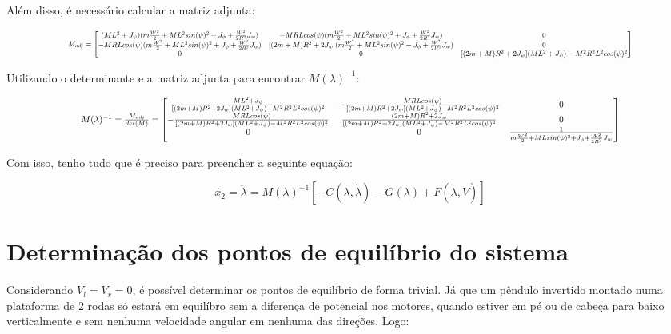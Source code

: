 \documentclass[10pt]{article}
\begin{document}
\quad Além disso, é necessário calcular a matriz adjunta:

\begin{equation}
    \scalebox{0.65}{$
    M_{adj} =
    \begin{bmatrix}
        (ML^2 + J_\psi)(m\frac{W^2}{2}+ML^2sin(\psi)^2+J_{\phi}+\frac{W^2}{2R^2}J_w) & -MRLcos(\psi)(m\frac{W^2}{2}+ML^2sin(\psi)^2+J_{\phi}+\frac{W^2}{2R^2}J_w) & 0 \\
        -MRLcos(\psi)(m\frac{W^2}{2}+ML^2sin(\psi)^2+J_{\phi}+\frac{W^2}{2R^2}J_w) & [(2m + M)R^2 + 2J_w](m\frac{W^2}{2}+ML^2sin(\psi)^2+J_{\phi}+\frac{W^2}{2R^2}J_w) & 0 \\
        0 & 0 & [(2m + M)R^2 + 2J_w](ML^2 + J_\psi) - M^2R^2L^2cos(\psi)^2
    \end{bmatrix}
    $}
\end{equation}

\quad Utilizando o determinante e a matriz adjunta para encontrar $M(\lambda)^{-1}$:

\begin{equation}
    \scalebox{0.8}{$
    M(\lambda)^{-1} = \frac{M_{adj}}{det(M)} =
    \begin{bmatrix}
        \frac{ML^2 + J_\psi}{[(2m + M)R^2 + 2J_w](ML^2 + J_\psi) - M^2R^2L^2cos(\psi)^2} & -\frac{MRLcos(\psi)}{[(2m + M)R^2 + 2J_w](ML^2 + J_\psi) - M^2R^2L^2cos(\psi)^2} & 0 \\
        -\frac{MRLcos(\psi)}{[(2m + M)R^2 + 2J_w](ML^2 + J_\psi) - M^2R^2L^2cos(\psi)^2} & \frac{(2m + M)R^2 + 2J_w}{[(2m + M)R^2 + 2J_w](ML^2 + J_\psi) - M^2R^2L^2cos(\psi)^2} & 0 \\
        0 & 0 & \frac{1}{m\frac{W^2}{2} + MLsin(\psi)^2 + J_\phi + \frac{W^2}{2R^2}J_w}
    \end{bmatrix}
    $}
\end{equation}

\quad Com isso, tenho tudo que é preciso para preencher a seguinte equação:

\begin{equation}
    \dot{x_2} = \ddot\lambda = M(\lambda)^{-1} \left[ -C(\lambda,\dot\lambda) - G(\lambda) + F(\dot\lambda,V) \right]
\end{equation}

\section{Determinação dos pontos de equilíbrio do sistema}

\quad Considerando $V_l = V_r = 0$, é possível determinar os pontos de equilíbrio de forma trivial.
Já que um pêndulo invertido montado numa plataforma de 2 rodas só estará em equilíbro sem a diferença de potencial nos motores,
quando estiver em pé ou de cabeça para baixo verticalmente e sem nenhuma velocidade angular em nenhuma das direções. Logo:
\end{document}
